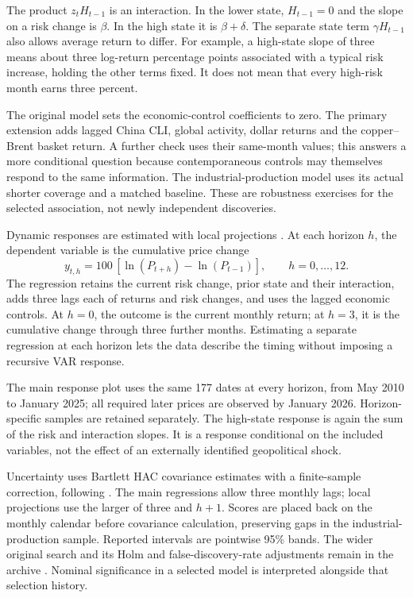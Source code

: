 The product $z_tH_{t-1}$ is an interaction. In the lower state, $H_{t-1}=0$ and the slope on a risk change is $\beta$. In the high state it is $\beta+\delta$. The separate state term $\gamma H_{t-1}$ also allows average return to differ. For example, a high-state slope of three means about three log-return percentage points associated with a typical risk increase, holding the other terms fixed. It does not mean that every high-risk month earns three percent.

The original model sets the economic-control coefficients to zero. The primary extension adds lagged China CLI, global activity, dollar returns and the copper–Brent basket return. A further check uses their same-month values; this answers a more conditional question because contemporaneous controls may themselves respond to the same information. The industrial-production model uses its actual shorter coverage and a matched baseline. These are robustness exercises for the selected association, not newly independent discoveries.

Dynamic responses are estimated with local projections \citep{jorda2005}. At each horizon $h$, the dependent variable is the cumulative price change
\begin{equation}
y_{t,h}=100\,[\ln(P_{t+h})-\ln(P_{t-1})],\qquad h=0,\ldots,12.
\label{eq:lp}
\end{equation}
The regression retains the current risk change, prior state and their interaction, adds three lags each of returns and risk changes, and uses the lagged economic controls. At $h=0$, the outcome is the current monthly return; at $h=3$, it is the cumulative change through three further months. Estimating a separate regression at each horizon lets the data describe the timing without imposing a recursive VAR response.

The main response plot uses the same 177 dates at every horizon, from May 2010 to January 2025; all required later prices are observed by January 2026. Horizon-specific samples are retained separately. The high-state response is again the sum of the risk and interaction slopes. It is a response conditional on the included variables, not the effect of an externally identified geopolitical shock.

Uncertainty uses Bartlett HAC covariance estimates with a finite-sample correction, following \citet{newey1987}. The main regressions allow three monthly lags; local projections use the larger of three and $h+1$. Scores are placed back on the monthly calendar before covariance calculation, preserving gaps in the industrial-production sample. Reported intervals are pointwise 95\% bands. The wider original search and its Holm and false-discovery-rate adjustments remain in the archive \citep{holm1979,benjamini1995}. Nominal significance in a selected model is interpreted alongside that selection history.
